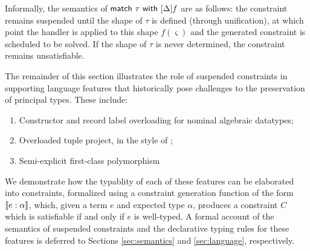 \documentclass[acmsmall,screen,nonacm]{acmart}
\begin{document}
Informally, the semantics of $\mathsf{match} ~ \tau ~ \mathsf{with} ~ [ \Delta ] f$ are as follows: the
constraint remains suspended until the shape of $\tau$ is defined (through unification), at which point
the handler is applied to this shape $f(\varsigma)$ and the
generated constraint is scheduled to be solved. If the shape of $\tau$ is never
determined, the constraint remains unsatisfiable.


The remainder of this section illustrates the role of suspended constraints in supporting 
language features that historically pose challenges to the preservation of principal types. 
These include:
\begin{enumerate}
  \item Constructor and record label overloading for nominal algebraic datatypes; 
  \item Overloaded tuple project, in the style of \SML; 
  \item Semi-explicit first-class polymorphism
\end{enumerate}
We demonstrate how the typablity of each of these features can be elaborated into 
constraints, formalized using a constraint generation function of the form $\llbracket e : \alpha \rrbracket$, 
which, given a term $e$ and expected type $\alpha$, produces a constraint $C$ which is satisfiable if 
and only if $e$ is well-typed. A formal account of the semantics of suspended constraints 
and the declarative typing rules for these features is deferred to Sections \ref{sec:semantics}
and \ref{sec:language}, respectively. 


\end{document}
